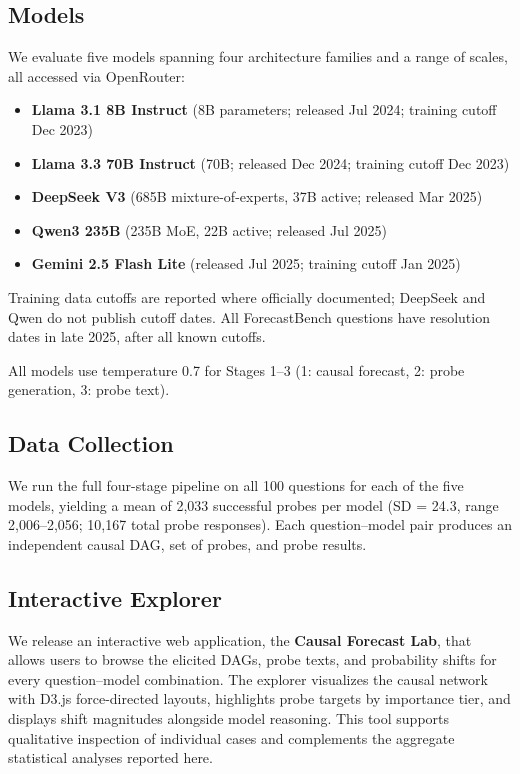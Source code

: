 \documentclass[11pt]{article}
\begin{document}
\subsection{Models}

We evaluate five models spanning four architecture families and a range of scales, all accessed via OpenRouter:
\begin{itemize}
    \item \textbf{Llama 3.1 8B Instruct} (8B parameters; released Jul 2024; training cutoff Dec 2023)
    \item \textbf{Llama 3.3 70B Instruct} (70B; released Dec 2024; training cutoff Dec 2023)
    \item \textbf{DeepSeek V3} (685B mixture-of-experts, 37B active; released Mar 2025)
    \item \textbf{Qwen3 235B} (235B MoE, 22B active; released Jul 2025)
    \item \textbf{Gemini 2.5 Flash Lite} (released Jul 2025; training cutoff Jan 2025)
\end{itemize}
Training data cutoffs are reported where officially documented; DeepSeek and Qwen do not publish cutoff dates. All ForecastBench questions have resolution dates in late 2025, after all known cutoffs.

All models use temperature 0.7 for Stages 1--3 (1: causal forecast, 2: probe generation, 3: probe text).

\subsection{Data Collection}

We run the full four-stage pipeline on all 100 questions for each of the five models, yielding a mean of 2,033 successful probes per model (SD = 24.3, range 2,006--2,056; 10,167 total probe responses). Each question--model pair produces an independent causal DAG, set of probes, and probe results.

\subsection{Interactive Explorer}

We release an interactive web application, the \textbf{Causal Forecast Lab}, that allows users to browse the elicited DAGs, probe texts, and probability shifts for every question--model combination. The explorer visualizes the causal network with D3.js force-directed layouts, highlights probe targets by importance tier, and displays shift magnitudes alongside model reasoning. This tool supports qualitative inspection of individual cases and complements the aggregate statistical analyses reported here.
\end{document}
